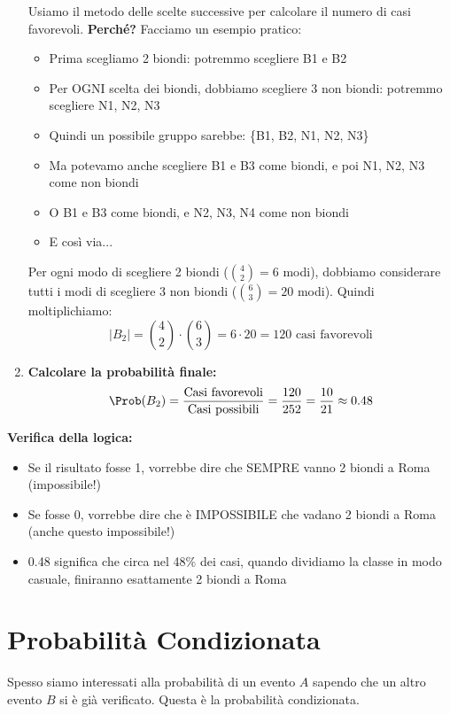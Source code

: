 \begin{example}
\begin{enumerate}
    Usiamo il metodo delle scelte successive per calcolare il numero di casi favorevoli. \textbf{Perché?}
    Facciamo un esempio pratico:
    \begin{itemize}
        \item Prima scegliamo 2 biondi: potremmo scegliere B1 e B2
        \item Per OGNI scelta dei biondi, dobbiamo scegliere 3 non biondi: potremmo scegliere N1, N2, N3
        \item Quindi un possibile gruppo sarebbe: \{B1, B2, N1, N2, N3\}
        \item Ma potevamo anche scegliere B1 e B3 come biondi, e poi N1, N2, N3 come non biondi
        \item O B1 e B3 come biondi, e N2, N3, N4 come non biondi
        \item E così via...
    \end{itemize}

    Per ogni modo di scegliere 2 biondi ($\binom{4}{2} = 6$ modi), dobbiamo considerare tutti i modi di scegliere 3 non biondi ($\binom{6}{3} = 20$ modi).
    Quindi moltiplichiamo:
    \[ |B_2| = \binom{4}{2} \cdot \binom{6}{3} = 6 \cdot 20 = 120 \text{ casi favorevoli} \]

    \item \textbf{Calcolare la probabilità finale:}
    \[ \Prob(B_2) = \frac{\text{Casi favorevoli}}{\text{Casi possibili}} = \frac{120}{252} = \frac{10}{21} \approx 0.48 \]
\end{enumerate}

\textbf{Verifica della logica:}
\begin{itemize}
    \item Se il risultato fosse 1, vorrebbe dire che SEMPRE vanno 2 biondi a Roma (impossibile!)
    \item Se fosse 0, vorrebbe dire che è IMPOSSIBILE che vadano 2 biondi a Roma (anche questo impossibile!)
    \item 0.48 significa che circa nel 48\% dei casi, quando dividiamo la classe in modo casuale, finiranno esattamente 2 biondi a Roma
\end{itemize}
\end{example}

\section{Probabilità Condizionata}
\label{sec:prob_cond}
Spesso siamo interessati alla probabilità di un evento $A$ sapendo che un altro evento $B$ si è già verificato. Questa è la probabilità condizionata.


